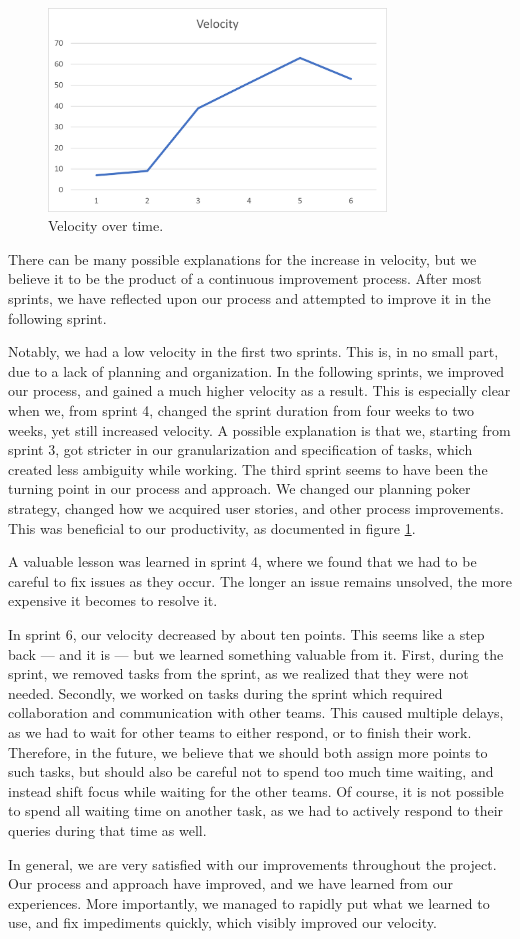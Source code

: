 \begin{figure}[h!]
\centering
\includegraphics[width=0.8\textwidth]{Images/VelocityAnalysis.png}
\caption{Velocity over time.}
\label{img:velocityOverTime}
\end{figure}

There can be many possible explanations for the increase in velocity, but we believe it to be the product of a continuous improvement process.
After most sprints, we have reflected upon our process and attempted to improve it in the following sprint.

Notably, we had a low velocity in the first two sprints. This is, in no small part, due to a lack of planning and organization. In the following sprints, we improved our process, and gained a much higher velocity as a result.
This is especially clear when we, from sprint 4, changed the sprint duration from four weeks to two weeks, yet still increased velocity.
A possible explanation is that we, starting from sprint 3, got stricter in our granularization and specification of tasks, which created less ambiguity while working.
The third sprint seems to have been the turning point in our process and approach. We changed our planning poker strategy, changed how we acquired user stories, and other process improvements. This was beneficial to our productivity, as documented in figure \ref{img:velocityOverTime}.

A valuable lesson was learned in sprint 4, where we found that we had to be careful to fix issues as they occur. The longer an issue remains unsolved, the more expensive it becomes to resolve it.

In sprint 6, our velocity decreased by about ten points. This seems like a step back --- and it is --- but we learned something valuable from it.
First, during the sprint, we removed tasks from the sprint, as we realized that they were not needed. 
Secondly, we worked on tasks during the sprint which required collaboration and communication with other teams. This caused multiple delays, as we had to wait for other teams to either respond, or to finish their work. Therefore, in the future, we believe that we should both assign more points to such tasks, but should also be careful not to spend too much time waiting, and instead shift focus while waiting for the other teams. Of course, it is not possible to spend all waiting time on another task, as we had to actively respond to their queries during that time as well.

In general, we are very satisfied with our improvements throughout the project. Our process and approach have improved, and we have learned from our experiences. More importantly, we managed to rapidly put what we learned to use, and fix impediments quickly, which visibly improved our velocity.